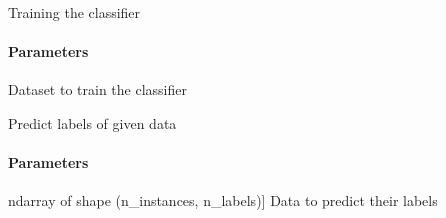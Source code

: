 \documentclass[letterpaper,10pt,english]{sphinxmanual}
\begin{document}
\begin{fulllineitems}
\begin{fulllineitems}
\label{\detokenize{classifier/mimlTOmi/_autosummary/miml.classifier.mimlTOmi.miml_to_mi_br_classifier.MIMLtoMIBRClassifier:miml.classifier.mimlTOmi.miml_to_mi_br_classifier.MIMLtoMIBRClassifier.fit_internal}}
\pysigstartsignatures
{}
\pysigstopsignatures
\sphinxAtStartPar
Training the classifier


\paragraph{Parameters}
\label{\detokenize{classifier/mimlTOmi/_autosummary/miml.classifier.mimlTOmi.miml_to_mi_br_classifier.MIMLtoMIBRClassifier:id2}}\begin{description}
\sphinxAtStartPar
Dataset to train the classifier

\end{description}

\end{fulllineitems}


\begin{fulllineitems}
\label{\detokenize{classifier/mimlTOmi/_autosummary/miml.classifier.mimlTOmi.miml_to_mi_br_classifier.MIMLtoMIBRClassifier:miml.classifier.mimlTOmi.miml_to_mi_br_classifier.MIMLtoMIBRClassifier.predict}}
\pysigstartsignatures
{}
\pysigstopsignatures
\sphinxAtStartPar
Predict labels of given data


\paragraph{Parameters}
\label{\detokenize{classifier/mimlTOmi/_autosummary/miml.classifier.mimlTOmi.miml_to_mi_br_classifier.MIMLtoMIBRClassifier:id3}}\begin{description}
\sphinxlineitem{x}{[}ndarray of shape (n\_instances, n\_labels){]}
\sphinxAtStartPar
Data to predict their labels


\end{description}
\end{fulllineitems}
\end{fulllineitems}
\end{document}
